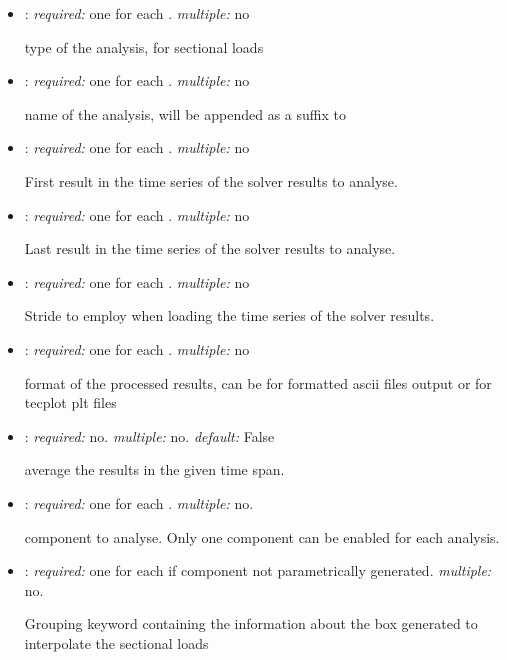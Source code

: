 \begin{itemize}
\item {}: \textit{required:} one for each . \textit{multiple:} no

type of the analysis,  for sectional loads

\item {}: \textit{required:} one for each . \textit{multiple:} no

name of the analysis, will be appended as a suffix to 

\item {}: \textit{required:} one for each . \textit{multiple:} no

First result in the time series of the solver results to analyse.

\item {}: \textit{required:} one for each . \textit{multiple:} no

Last result in the time series of the solver results to analyse.

\item {}: \textit{required:} one for each . \textit{multiple:} no

Stride to employ when loading the time series of the solver results. 

\item {}: \textit{required:} one for each . \textit{multiple:} no

format of the processed results, can be  for formatted ascii files output or  for tecplot plt files

\item {}: \textit{required:} no. \textit{multiple:} no. \textit{default:} False

average the results in the given time span.

\item {}: \textit{required:} one for each . \textit{multiple:} no.

component to analyse. Only one component can be enabled for each analysis. 

\item {}: \textit{required:} one for each  if component not parametrically generated. \textit{multiple:} no.

Grouping keyword containing the information about the box generated to interpolate the sectional loads


\end{itemize}
